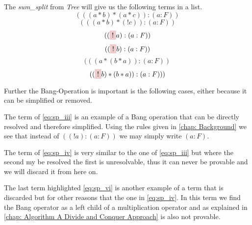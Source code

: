 

The \emph{sum\_split} from \emph{Tree} will give us the following terms in a list.
\begin{equation}\label{eq:sp_i}	
	(((a * b)*(a * c)):(a:F))											
\end{equation}
\begin{equation}\label{eq:sp_ii}	
	(((a * b)*(! c)):(a:F))												
\end{equation}
\begin{equation}\label{eq:sp_iii}	
	((\tikz[baseline]{\node[fill=red!20,anchor=base](t1){$!$};}a):(a:F))
\end{equation}
\begin{equation}\label{eq:sp_iv}	
	((\tikz[baseline]{\node[fill=red!20,anchor=base](t1){$!$};}b):(a:F))
\end{equation}	
\begin{equation}\label{eq:sp_v}	
	(((a*(b * a)):(a:F))												
\end{equation}
\begin{equation}\label{eq:sp_vi}	
	((\tikz[baseline]{\node[fill=red!20,anchor=base](t1){$!$};}b)*(b * a)):(a:F)))
\end{equation}

Further the Bang-Operation is important is the following cases, either because it can be simplified or removed.



The term of \ref{eq:sp_iii} is an example of a Bang operation that can be directly resolved and therefore simplified. Using the rules given in \ref{chap: Background} we see that instead of $((!a):(a:F))$ we may simply write $(a:F)$.



The term of \ref{eq:sp_iv} is very similar to the one of \ref{eq:sp_iii} but where the second my be resolved the first is unresolvable, thus it can never be provable and we will discard it from here on.



The last term highlighted \ref{eq:sp_vi} is another example of a term that is discarded but for other reasons that the one in \ref{eq:sp_iv}. In this term we find the Bang operator as a left child of a multiplication operator and as explained in \ref{chap: Algorithm A Divide and Conquer Approach} is also not provable.

